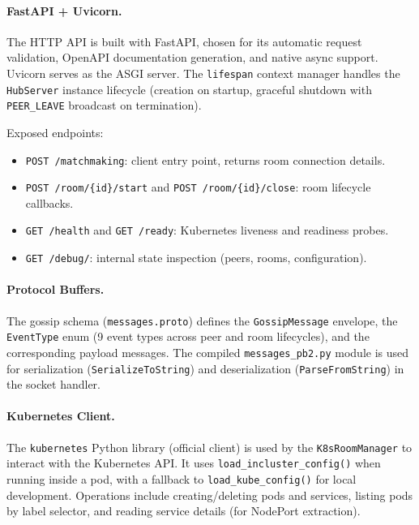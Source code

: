 \paragraph{FastAPI + Uvicorn.}
The HTTP API is built with FastAPI, chosen for its automatic request validation, OpenAPI documentation generation, and native async support. Uvicorn serves as the ASGI server. The \texttt{lifespan} context manager handles the \texttt{HubServer} instance lifecycle (creation on startup, graceful shutdown with \texttt{PEER\_LEAVE} broadcast on termination).

Exposed endpoints:
\begin{itemize}
  \item \texttt{POST /matchmaking}: client entry point, returns room connection details.
  \item \texttt{POST /room/\{id\}/start} and \texttt{POST /room/\{id\}/close}: room lifecycle callbacks.
  \item \texttt{GET /health} and \texttt{GET /ready}: Kubernetes liveness and readiness probes.
  \item \texttt{GET /debug/}: internal state inspection (peers, rooms, configuration).
\end{itemize}

\paragraph{Protocol Buffers.}
The gossip schema (\texttt{messages.proto}) defines the \texttt{GossipMessage} envelope, the \texttt{EventType} enum (9 event types across peer and room lifecycles), and the corresponding payload messages. The compiled \texttt{messages\_pb2.py} module is used for serialization (\texttt{SerializeToString}) and deserialization (\texttt{ParseFromString}) in the socket handler.

\paragraph{Kubernetes Client.}
The \texttt{kubernetes} Python library (official client) is used by the \texttt{K8sRoomManager} to interact with the Kubernetes API. It uses \texttt{load\_incluster\_config()} when running inside a pod, with a fallback to \texttt{load\_kube\_config()} for local development. Operations include creating/deleting pods and services, listing pods by label selector, and reading service details (for NodePort extraction).

